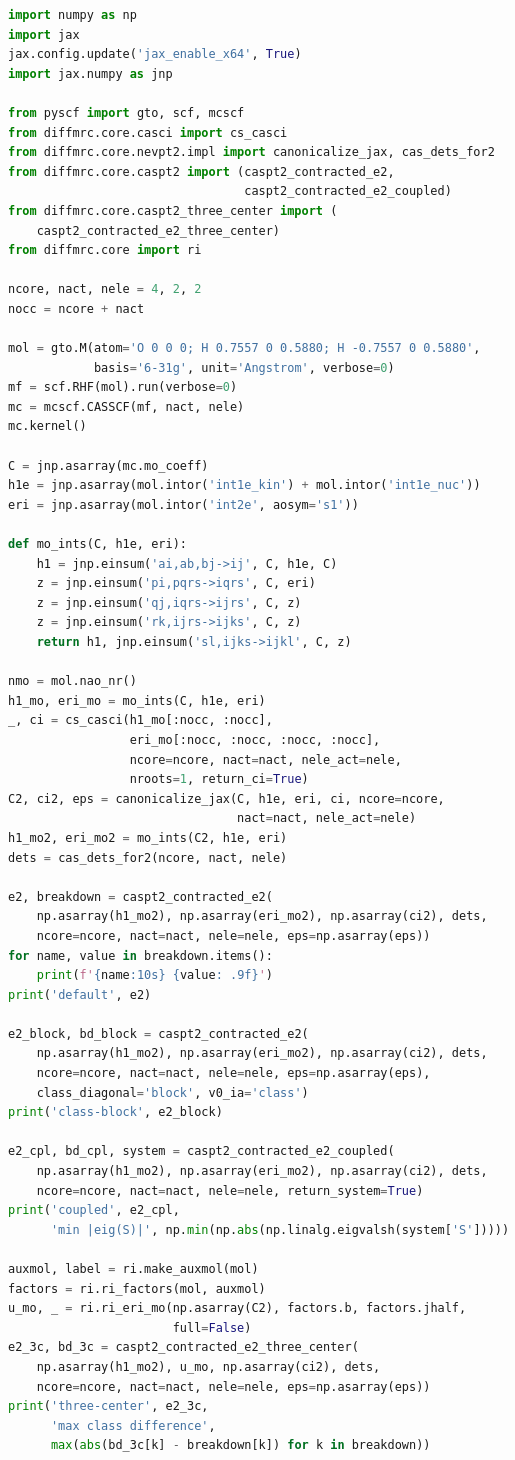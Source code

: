 \begin{lstlisting}[language=Python]
import numpy as np
import jax
jax.config.update('jax_enable_x64', True)
import jax.numpy as jnp

from pyscf import gto, scf, mcscf
from diffmrc.core.casci import cs_casci
from diffmrc.core.nevpt2.impl import canonicalize_jax, cas_dets_for2
from diffmrc.core.caspt2 import (caspt2_contracted_e2,
                                 caspt2_contracted_e2_coupled)
from diffmrc.core.caspt2_three_center import (
    caspt2_contracted_e2_three_center)
from diffmrc.core import ri

ncore, nact, nele = 4, 2, 2
nocc = ncore + nact

mol = gto.M(atom='O 0 0 0; H 0.7557 0 0.5880; H -0.7557 0 0.5880',
            basis='6-31g', unit='Angstrom', verbose=0)
mf = scf.RHF(mol).run(verbose=0)
mc = mcscf.CASSCF(mf, nact, nele)
mc.kernel()

C = jnp.asarray(mc.mo_coeff)
h1e = jnp.asarray(mol.intor('int1e_kin') + mol.intor('int1e_nuc'))
eri = jnp.asarray(mol.intor('int2e', aosym='s1'))

def mo_ints(C, h1e, eri):
    h1 = jnp.einsum('ai,ab,bj->ij', C, h1e, C)
    z = jnp.einsum('pi,pqrs->iqrs', C, eri)
    z = jnp.einsum('qj,iqrs->ijrs', C, z)
    z = jnp.einsum('rk,ijrs->ijks', C, z)
    return h1, jnp.einsum('sl,ijks->ijkl', C, z)

nmo = mol.nao_nr()
h1_mo, eri_mo = mo_ints(C, h1e, eri)
_, ci = cs_casci(h1_mo[:nocc, :nocc],
                 eri_mo[:nocc, :nocc, :nocc, :nocc],
                 ncore=ncore, nact=nact, nele_act=nele,
                 nroots=1, return_ci=True)
C2, ci2, eps = canonicalize_jax(C, h1e, eri, ci, ncore=ncore,
                                nact=nact, nele_act=nele)
h1_mo2, eri_mo2 = mo_ints(C2, h1e, eri)
dets = cas_dets_for2(ncore, nact, nele)

e2, breakdown = caspt2_contracted_e2(
    np.asarray(h1_mo2), np.asarray(eri_mo2), np.asarray(ci2), dets,
    ncore=ncore, nact=nact, nele=nele, eps=np.asarray(eps))
for name, value in breakdown.items():
    print(f'{name:10s} {value: .9f}')
print('default', e2)

e2_block, bd_block = caspt2_contracted_e2(
    np.asarray(h1_mo2), np.asarray(eri_mo2), np.asarray(ci2), dets,
    ncore=ncore, nact=nact, nele=nele, eps=np.asarray(eps),
    class_diagonal='block', v0_ia='class')
print('class-block', e2_block)

e2_cpl, bd_cpl, system = caspt2_contracted_e2_coupled(
    np.asarray(h1_mo2), np.asarray(eri_mo2), np.asarray(ci2), dets,
    ncore=ncore, nact=nact, nele=nele, return_system=True)
print('coupled', e2_cpl,
      'min |eig(S)|', np.min(np.abs(np.linalg.eigvalsh(system['S']))))

auxmol, label = ri.make_auxmol(mol)
factors = ri.ri_factors(mol, auxmol)
u_mo, _ = ri.ri_eri_mo(np.asarray(C2), factors.b, factors.jhalf,
                       full=False)
e2_3c, bd_3c = caspt2_contracted_e2_three_center(
    np.asarray(h1_mo2), u_mo, np.asarray(ci2), dets,
    ncore=ncore, nact=nact, nele=nele, eps=np.asarray(eps))
print('three-center', e2_3c,
      'max class difference',
      max(abs(bd_3c[k] - breakdown[k]) for k in breakdown))
\end{lstlisting}

